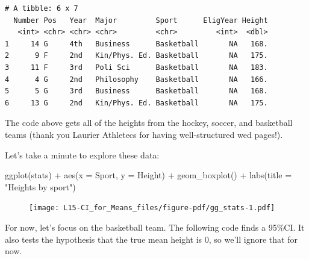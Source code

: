 \documentclass[
  letterpaper,
  DIV=11,
  numbers=noendperiod,
  oneside]{scrreprt}
\newenvironment{Shaded}{\begin{snugshade}}{\end{snugshade}}
\newcommand{\AttributeTok}[1]{\textcolor[rgb]{0.40,0.45,0.13}{#1}}
\newcommand{\CommentTok}[1]{\textcolor[rgb]{0.37,0.37,0.37}{#1}}
\newcommand{\FunctionTok}[1]{\textcolor[rgb]{0.28,0.35,0.67}{#1}}
\newcommand{\NormalTok}[1]{\textcolor[rgb]{0.00,0.23,0.31}{#1}}
\newcommand{\OtherTok}[1]{\textcolor[rgb]{0.00,0.23,0.31}{#1}}
\newcommand{\SpecialCharTok}[1]{\textcolor[rgb]{0.37,0.37,0.37}{#1}}
\newcommand{\StringTok}[1]{\textcolor[rgb]{0.13,0.47,0.30}{#1}}
\begin{document}
\begin{verbatim}
# A tibble: 6 x 7
  Number Pos   Year  Major         Sport      EligYear Height
   <int> <chr> <chr> <chr>         <chr>         <int>  <dbl>
1     14 G     4th   Business      Basketball       NA   168.
2      9 F     2nd   Kin/Phys. Ed. Basketball       NA   175.
3     11 F     3rd   Poli Sci      Basketball       NA   183.
4      4 G     2nd   Philosophy    Basketball       NA   166.
5      5 G     3rd   Business      Basketball       NA   168.
6     13 G     2nd   Kin/Phys. Ed. Basketball       NA   175.
\end{verbatim}

The code above gets all of the heights from the hockey, soccer, and
basketball teams (thank you Laurier Athletecs for having well-structured
wed pages!).

Let's take a minute to explore these data:

\begin{Shaded}
\begin{Highlighting}[]
\FunctionTok{ggplot}\NormalTok{(stats) }\SpecialCharTok{+}
    \FunctionTok{aes}\NormalTok{(}\AttributeTok{x =}\NormalTok{ Sport, }\AttributeTok{y =}\NormalTok{ Height) }\SpecialCharTok{+}
    \FunctionTok{geom\_boxplot}\NormalTok{() }\SpecialCharTok{+}
    \FunctionTok{labs}\NormalTok{(}\AttributeTok{title =} \StringTok{"Heights by sport"}\NormalTok{)}
\end{Highlighting}
\end{Shaded}

\begin{figure}[H]

{\centering \texttt{[image: L15-CI\_for\_Means\_files/figure-pdf/gg\_stats-1.pdf]}

}

\end{figure}

For now, let's focus on the basketball team. The following code finds a
95\%CI. It also tests the hypothesis that the true mean height is 0, so
we'll ignore that for now.

\begin{Shaded}
\end{Shaded}
\end{document}
